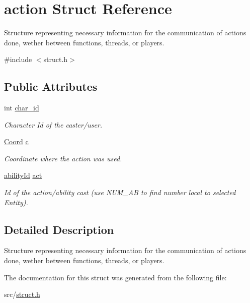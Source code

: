 \hypertarget{structaction}{}\section{action Struct Reference}
\label{structaction}


Structure representing necessary information for the communication of actions done, wether between functions, threads, or players.  




{\ttfamily \#include $<$struct.\+h$>$}

\subsection*{Public Attributes}
\begin{DoxyCompactItemize}
\item 
\mbox{\label{structaction_ae2499e72f25e9323a7e91160b8c58a87}} 
int \hyperlink{structaction_ae2499e72f25e9323a7e91160b8c58a87}{char\+\_\+id}
\begin{DoxyCompactList}\small\item\em Character Id of the caster/user. \end{DoxyCompactList}\item 
\mbox{\label{structaction_a4a5c4af0a2a3274ecfce21da29e47cb5}} 
\hyperlink{struct_coord}{Coord} \hyperlink{structaction_a4a5c4af0a2a3274ecfce21da29e47cb5}{c}
\begin{DoxyCompactList}\small\item\em Coordinate where the action was used. \end{DoxyCompactList}\item 
\mbox{\label{structaction_ab835a2e4215fb2ac2a47cd41a0690e22}} 
\hyperlink{substruct_8h_a474a755e4cfa53534567029009496507}{ability\+Id} \hyperlink{structaction_ab835a2e4215fb2ac2a47cd41a0690e22}{act}
\begin{DoxyCompactList}\small\item\em Id of the action/ability cast (use N\+U\+M\+\_\+\+AB to find number local to selected Entity). \end{DoxyCompactList}\end{DoxyCompactItemize}


\subsection{Detailed Description}
Structure representing necessary information for the communication of actions done, wether between functions, threads, or players. 

The documentation for this struct was generated from the following file\+:\begin{DoxyCompactItemize}
\item 
src/\hyperlink{struct_8h}{struct.\+h}\end{DoxyCompactItemize}
